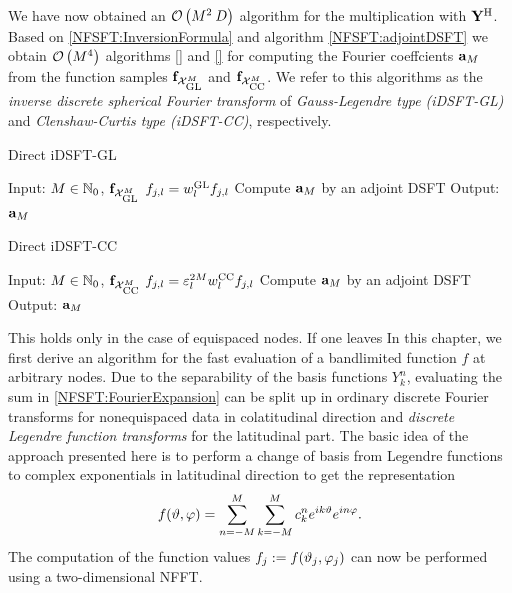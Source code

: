 We have now obtained an $\mathcal{O}\left(M^2\:D\right)$ algorithm for the multiplication with $\mathbf{Y}^{\text{\rm{H}}}$. Based on \ref{NFSFT:InversionFormula} and algorithm \ref{NFSFT:adjointDSFT} we obtain $\mathcal{O}\left(M^4\right)$ algorithms \ref{} and \ref{} for computing the Fourier coeffcients $\mathbf{a}_{M}$ from the function samples $\mathbf{f}_{\mathcal{X}_{\mbox{\scriptsize\rm{GL}}}^M}$ and $\mathbf{f}_{\mathcal{X}_{\mbox{\scriptsize\rm{CC}}}^M}$. We refer to this algorithms as the \emph{inverse discrete spherical Fourier transform} of \emph{Gauss-Legendre type (iDSFT-GL)} and \emph{Clenshaw-Curtis type (iDSFT-CC)}, respectively.
\begin{algorithm}[htb]
  \caption{Direct iDSFT-GL}
  \label{NFSFT:directIDSFTGL}    
  \begin{algorithmic}
    \STATE Input: $M \in \mathbb{N}_{0}$, $\mathbf{f}_{\mathcal{X}_{\mbox{\scriptsize\rm{GL}}}^M}$
    \STATE
        \STATE $f_{j,l} = w^{\mbox{\scriptsize\rm{GL}}}_{l} f_{j,l}$ 
      \ENDFOR
    \ENDFOR
    \STATE Compute $\mathbf{a}_{M}$ by an adjoint DSFT
    \STATE
    \STATE Output: $\mathbf{a}_{M}$
  \end{algorithmic}
\end{algorithm}
\begin{algorithm}[htb]
  \caption{Direct iDSFT-CC}
  \label{NFSFT:directIDSFTCC}    
  \begin{algorithmic}
    \STATE Input: $M \in \mathbb{N}_{0}$, $\mathbf{f}_{\mathcal{X}_{\mbox{\scriptsize\rm{CC}}}^M}$
    \STATE
        \STATE $f_{j,l} = \varepsilon_{l}^{2M} w^{\mbox{\scriptsize\rm{CC}}}_{l} f_{j,l}$ 
      \ENDFOR
    \ENDFOR
    \STATE Compute $\mathbf{a}_{M}$ by an adjoint DSFT
    \STATE
    \STATE Output: $\mathbf{a}_{M}$
  \end{algorithmic}
\end{algorithm}



This holds only in the case of equispaced nodes. If one leaves 
In this chapter, we first derive an algorithm for the fast evaluation of a bandlimited function $f$ at arbitrary nodes. Due to the separability 
of the basis functions $Y_k^n$, evaluating the sum in \eqref{NFSFT:FourierExpansion} can be split up in ordinary discrete Fourier transforms for nonequispaced 
data in colatitudinal direction and \emph{discrete Legendre function transforms} for the latitudinal part. The basic idea of the approach 
presented here is to perform a change of basis from Legendre functions to complex exponentials in latitudinal direction to get the 
representation
$$ f{\hspace{-0.4ex}}\left(\vartheta,\varphi\right) = \sum_{n=-M}^{M} \sum_{k=-M}^M c_k^n e^{ik\vartheta} e^{in\varphi}.$$
The computation of the function values $f_j := f{\hspace{-0.4ex}}\left(\vartheta_j,\varphi_j\right)$ can now be performed 
using a two-dimensional NFFT. 

